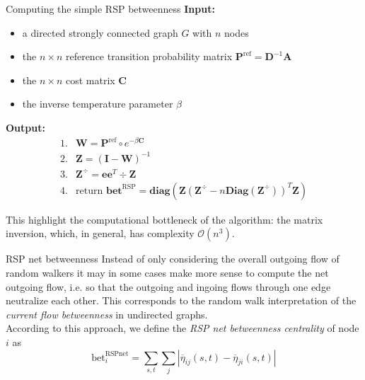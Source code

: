 \documentclass[13pt]{beamer}
\begin{document}
    \begin{frame}[t,allowframebreaks]{Computing the simple RSP betweenness}
    \textbf{Input:}
    \begin{itemize}
        \item a directed strongly connected graph $G$ with $n$ nodes
        \item the $n\times n$ reference transition probability matrix $\mathbf{P}^\text{ref}=\mathbf{D}^{-1}\mathbf{A}$
        \item the $n\times n$ cost matrix $\mathbf{C}$
        \item the inverse temperature parameter $\beta$
    \end{itemize}

    \textbf{Output:}
    \begin{equation*}
    \begin{array}{cl}
    1. & \mathbf{W}=\mathbf{P}^\text{ref}\circ e^{-\beta\mathbf{C}} \\
    2. & \mathbf{Z}=(\mathbf{I}-\mathbf{W})^{-1} \\
    3. & \mathbf{Z}^\div=\mathbf{e}\mathbf{e}^T\div\mathbf{Z} \\
    4. & \text{return }\textbf{bet}^\text{RSP}=\textbf{diag}\left( \mathbf{Z} \left(\mathbf{Z}^\div-n \textbf{Diag}\left( \mathbf{Z}^\div \right) \right)^T\mathbf{Z} \right)
    \end{array}
    \end{equation*}

    This highlight the computational bottleneck of the algorithm: the matrix inversion, which, in general, has complexity $\mathcal{O}\left( n^3 \right)$.
    \end{frame}

    \begin{frame}[t,allowframebreaks]{RSP net betweenness}
    Instead of only considering the overall outgoing flow of random walkers it may in some cases make more sense to compute the net outgoing flow, i.e. so that the outgoing and ingoing flows through one edge neutralize each other. This corresponds to the random walk interpretation of the \emph{current flow betweenness} in undirected graphs.\\
    \vspace{0.8em} 
    According to this approach, we define the \emph{RSP net betweenness centrality} of node $i$ as
    \begin{equation*}
    \text{bet}_i^{\text{RSPnet}}=\sum_{s,t}
    \sum_{j}\left|\overline{\eta}_{ij}(s,t)-\overline{\eta}_{ji}(s,t)\right|
    \end{equation*}

    \end{frame}
\end{document}

